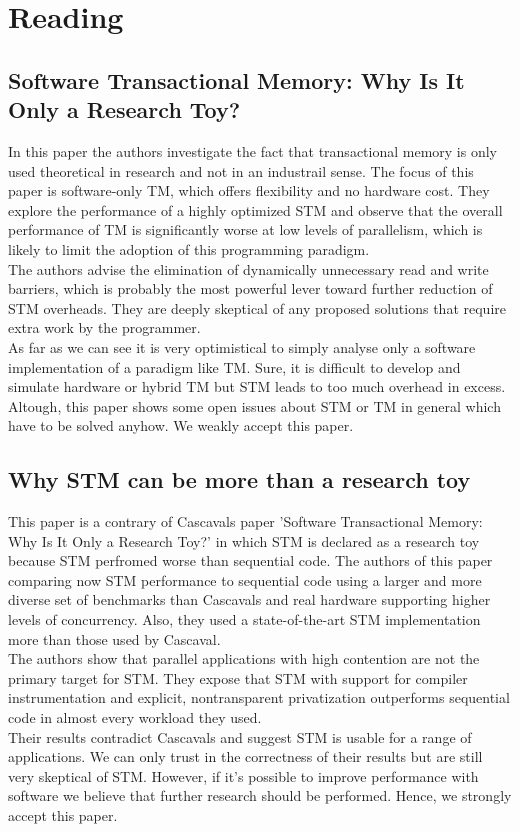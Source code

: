 \documentclass{article}
\newcommand{\enterProblemHeader}[1]{
}
\newcommand{\exitProblemHeader}[1]{
}
\newcounter{homeworkProblemCounter} %
\newcommand{\homeworkProblemName}{}
\newenvironment{homeworkProblem}[1][Problem \arabic{homeworkProblemCounter}]{ %
\stepcounter{homeworkProblemCounter} %
\renewcommand{\homeworkProblemName}{#1} %
\section{\homeworkProblemName} %
}{
}
\begin{document}
\begin{homeworkProblem}[Reading]
\subsection{Software Transactional Memory: Why Is It Only a Research Toy?}
In this paper the authors investigate the fact that transactional memory is only used 
theoretical in research and not in an industrail sense. The focus of this paper is 
software-only TM, which offers flexibility and no hardware cost. They explore the performance 
of a highly optimized STM and observe that the overall performance of TM is significantly 
worse at low levels of parallelism, which is likely to limit the adoption of this programming
paradigm.
\\
The authors advise the elimination of dynamically unnecessary read and write barriers, which
is probably the most powerful lever toward further reduction of STM overheads. They are deeply
skeptical of any proposed solutions that require extra work by the programmer.
\\
As far as we can see it is very optimistical to simply analyse only a software implementation
of a paradigm like TM. Sure, it is difficult to develop and simulate hardware or hybrid TM 
but STM leads to too much overhead in excess. Altough, this paper shows some open issues 
about STM or TM in general which have to be solved anyhow. We weakly accept this paper.

\subsection{Why STM can be more than a research toy}
This paper is a contrary of Cascavals paper 'Software Transactional Memory: Why Is It Only
a Research Toy?' in which STM is declared as a research toy because STM perfromed worse than
sequential code. The authors of this paper comparing now STM performance to sequential code
using a larger and more diverse set of benchmarks than Cascavals and real hardware supporting
higher levels of concurrency. Also, they used a state-of-the-art STM implementation more than
those used by Cascaval.
\\
The authors show that parallel applications with high contention are not the primary target
for STM. They expose that STM with support for compiler instrumentation and explicit, 
nontransparent privatization outperforms sequential code in almost every workload they used.
\\
Their results contradict Cascavals and suggest STM is usable for a range of applications.
We can only trust in the correctness of their results but are still very skeptical of STM.
However, if it's possible to improve performance with software we believe that further 
research should be performed. Hence, we strongly accept this paper.
\end{homeworkProblem}
\end{document}

